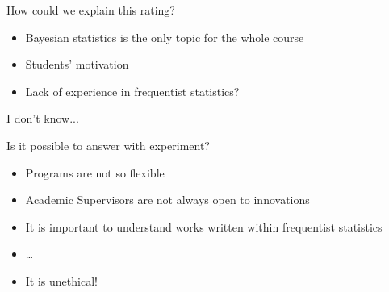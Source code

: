 \documentclass[13pt, t]{beamer}
\begin{document}
\begin{frame}{How could we explain this rating?}
\begin{itemize}
\item Bayesian statistics is the only topic for the whole course \pause
\item Students' motivation\pause
\item Lack of experience in frequentist statistics?
\end{itemize}
I don't know...
\end{frame}


\begin{frame}{Is it possible to answer with experiment?}
\begin{itemize}
\item Programs are not so flexible
\item Academic Supervisors are not always open to innovations
\item It is important to understand works written within frequentist statistics
\item \dots \pause
\item It is unethical!
\end{itemize}
\end{frame}

\end{document}
